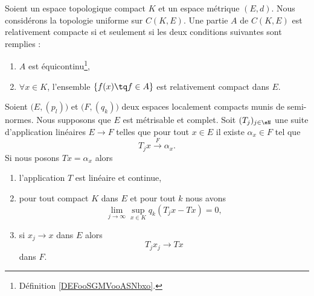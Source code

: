 \begin{theorem}        \label{ThoKRbtpah}
    Soient un espace topologique compact \( K\) et un espace métrique \( (E,d)\). Nous considérons la topologie uniforme sur \( C(K,E)\). Une partie \( A\) de \( C(K,E)\) est relativement compacte si et seulement si les deux conditions suivantes sont remplies :
    \begin{enumerate}
        \item
            \( A\) est équicontinu\footnote{Définition \ref{DEFooSGMVooASNbxo}.},
        \item
            \( \forall x\in K\), l'ensemble \( \{ f(x)\tq f\in A \}\) est relativement compact dans \( E\).
    \end{enumerate}
\end{theorem}



\begin{corollary}   \label{CorPGwLluz}
    Soient \( \big( E,(p_l) \big)\) et \( \big( F,(q_k) \big)\) deux espaces localement compacts munis de semi-normes. Nous supposons que \( E\) est métrisable et complet. Soit \( (T_j)_{j\in \eN}\) une suite d'application linéaires \( E\to F\) telles que pour tout \( x\in E\) il existe \( \alpha_x\in F\) tel que
    \begin{equation}
        T_jx\stackrel{F}{\longrightarrow}\alpha_x.
    \end{equation}
    Si nous posons \( Tx=\alpha_x\) alors
    \begin{enumerate}
        \item   \label{ItemAEOtOMLi}
            l'application \( T\) est linéaire et continue,
        \item
            pour tout compact \( K\) dans \( E\) et pour tout \( k\) nous avons
            \begin{equation}
                \lim_{j\to \infty} \sup_{x\in K}q_k(T_jx-Tx)=0,
            \end{equation}
        \item   \label{ItemAEOtOMLiii}
            si \( x_j\to x\) dans \( E\) alors
            \begin{equation}
                T_jx_j\to Tx
            \end{equation}
            dans \( F\).
    \end{enumerate}
\end{corollary}

